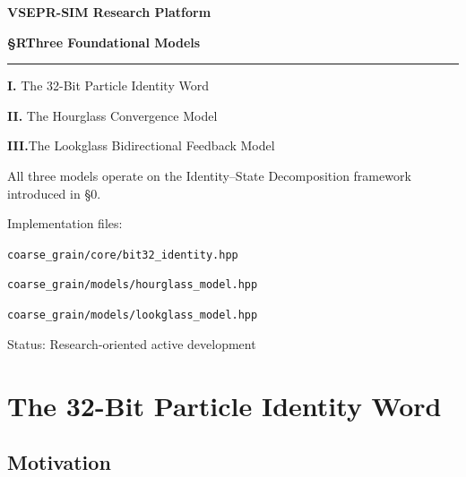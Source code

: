 \documentclass[11pt, a4paper, oneside]{article}
\theoremstyle{definition}
\newcommand{\file}[1]{\texttt{#1}}
\begin{document}

\begin{titlepage}
  \centering
  \vspace*{2cm}
  {\Huge\bfseries VSEPR-SIM Research Platform\par}
  \vspace{1cm}
  {\Large\bfseries §R\quad Three Foundational Models\par}
  \vspace{0.5cm}
  \rule{0.6\textwidth}{0.4pt}\par
  \vspace{0.8cm}
  {\large
    \textbf{I.}  The 32-Bit Particle Identity Word\par
    \vspace{0.3cm}
    \textbf{II.} The Hourglass Convergence Model\par
    \vspace{0.3cm}
    \textbf{III.}The Lookglass Bidirectional Feedback Model\par
  }
  \vspace{1.5cm}
  {\normalsize
    All three models operate on the Identity–State Decomposition
    framework introduced in §0.\par
    \vspace{0.5cm}
    Implementation files:\par
    \file{coarse\_grain/core/bit32\_identity.hpp}\par
    \file{coarse\_grain/models/hourglass\_model.hpp}\par
    \file{coarse\_grain/models/lookglass\_model.hpp}\par
  }
  \vfill
  {\small Status: Research-oriented active development}
\end{titlepage}

\tableofcontents
\clearpage

\section{The 32-Bit Particle Identity Word}
\label{sec:bit32}

\subsection{Motivation}
\end{document}
